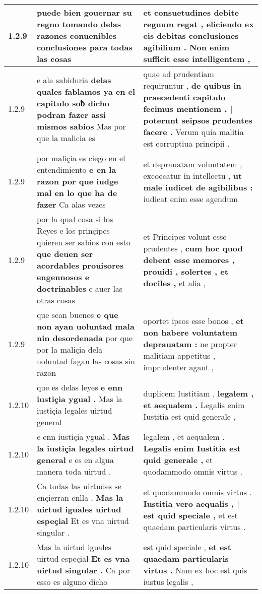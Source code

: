 \begin{tabular}{|p{1cm}|p{6.5cm}|p{6.5cm}|}
1.2.9 & puede bien gouernar su regno \textbf{ tomando delas razones conuenibles conclusiones } para todas las cosas & et consuetudines debite regnum regat , \textbf{ eliciendo ex eis debitas conclusiones agibilium . } Non enim sufficit esse intelligentem , \\\hline
1.2.9 & e ala sabiduria \textbf{ delas quales fablamos ya en el capitulo soƀ dicho podran fazer assi mismos sabios } Mas por que la malicia es & quae ad prudentiam requiruntur , \textbf{ de quibus in praecedenti capitulo fecimus mentionem , | poterunt seipsos prudentes facere . } Verum quia malitia est corruptiua principii . \\\hline
1.2.9 & por maliçia es ciego en el entendimiento \textbf{ e en la razon por que iudge mal en lo que ha de fazer } Ca alas vezes & et deprauatam voluntatem , excoecatur in intellectu , \textbf{ ut male iudicet de agibilibus : } iudicat enim esse agendum \\\hline
1.2.9 & por la qual cosa si los Reyes e los prinçipes quieren ser sabios con esto \textbf{ que deuen ser acordables prouisores engennosos e doctrinables } e auer las otras cosas & et Principes volunt esse prudentes , \textbf{ cum hoc quod debent esse memores , prouidi , solertes , et dociles , } et alia , \\\hline
1.2.9 & que sean buenos \textbf{ e que non ayan uoluntad mala nin desordenada } por que por la maliçia dela uoluntad fagan las cosas sin razon & oportet ipsos esse bonos , \textbf{ et non habere voluntatem deprauatam : } ne propter malitiam appetitus , imprudenter agant , \\\hline
1.2.10 & que es delas leyes \textbf{ e enn iustiçia ygual . } Mas la iustiçia legales uirtud general & duplicem Iustitiam , \textbf{ legalem , et aequalem . } Legalis enim Iustitia est quid generale , \\\hline
1.2.10 & e enn iustiçia ygual . \textbf{ Mas la iustiçia legales uirtud general } e es en algua manera toda uirtud . & legalem , et aequalem . \textbf{ Legalis enim Iustitia est quid generale , } et quodammodo omnis virtus . \\\hline
1.2.10 & Ca todas las uirtudes se ençierran enlla . \textbf{ Mas la uirtud iguales uirtud espeçial } Et es vna uirtud singular . & et quodammodo omnis virtus . \textbf{ Iustitia vero aequalis , | est quid speciale , } et est quaedam particularis virtus . \\\hline
1.2.10 & Mas la uirtud iguales uirtud espeçial \textbf{ Et es vna uirtud singular . } Ca por esso es alguno dicho & est quid speciale , \textbf{ et est quaedam particularis virtus . } Nam ex hoc est quis iustus legalis , \\\hline

\end{tabular}

